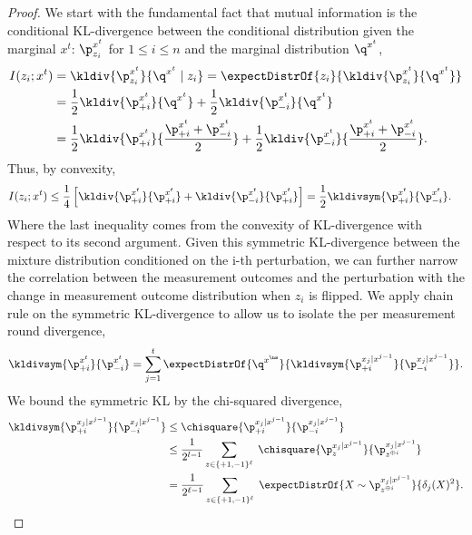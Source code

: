 \begin{proof}
    We start with the fundamental fact that mutual information is the conditional KL-divergence between the conditional distribution given the marginal $x^t$: $\p^{\out^t}_{z_i}$ for $1 \leq i \leq n$ and the marginal distribution $\q^{\out^t}$,
\begin{align*}
    I(z_i;x^t) &= \kldiv{\p^{\out^t}_{z_i}}{\q^{\out^t} \mid z_i} = \expectDistrOf{z_i}{\kldiv{\p^{\out^t}_{z_i}}{\q^{\out^t}}} \\ &= \frac{1}{2} \kldiv{\p_{+i}^{\out^t}}{\q^{\out^t}} + \frac{1}{2} \kldiv{\p_{-i}^{\out^t}}{\q^{\out^t}} \\ 
    &= \frac{1}{2} \kldiv{\p_{+i}^{\out^t}}{\frac{\p_{+i}^{\out^t} + \p_{-i}^{\out^t}}{2}} + \frac{1}{2} \kldiv{\p_{-i}^{\out^t}}{\frac{\p_{+i}^{\out^t} + \p_{-i}^{\out^t}}{2}}.
\end{align*}
Thus, by convexity, 
\begin{align}
    I(z_i;x^t) &\leq \frac{1}{4} \left[\kldiv{\p^{\out^t}_{+i}}{\p^{\out^t}_{+i}}+\kldiv{\p^{\out^t}_{-i}}{\p^{\out^t}_{+i}} \right] = \frac{1}{2} \kldivsym{\p^{\out^t}_{+i}}{\p^{\out^t}_{-i}} \label{pf:MI-bound}.
\end{align}
Where the last inequality comes from the convexity of KL-divergence with respect to its second argument. Given this symmetric KL-divergence between the mixture distribution conditioned on the i-th perturbation, we can further narrow the correlation between the measurement outcomes and the perturbation with the change in measurement outcome distribution when $z_i$ is flipped. We apply chain rule on the symmetric KL-divergence to allow us to isolate the per measurement round divergence,
\begin{align}
    \kldivsym{\p^{\out^t}_{+i}}{\p^{\out^t}_{-i}} = \sum_{j=1}^{t} \expectDistrOf{\q^{x^\ns}}{\kldivsym{\p^{\out_{j}|\out^{j-1}}_{+i}}{\p^{\out_{j}|\out^{j-1}}_{-i}}}.
    \label{eq:per-round-divergence}
\end{align}
We bound the symmetric KL by the chi-squared divergence,
\begin{align*}
    \kldivsym{\p^{\out_{j}|\out^{j-1}}_{+i}}{\p^{\out_{j}|\out^{j-1}}_{-i}} &\le \chisquare{\p^{\out_{j}|\out^{j-1}}_{+i}}{\p^{\out_{j}|\out^{j-1}}_{-i}} \\
    &\leq \frac{1}{2^{l-1}} \sum_{z \in \{+1,-1\}^\ell} \; \chisquare{\p^{\out_{j}|\out^{j-1}}_{z}}{\p^{\out_{j}|\out^{j-1}}_{z^{\oplus i}}}  \\
    &= \frac{1}{2^{\ell-1}} \sum_{z \in \{+1,-1\}^\ell} \; \expectDistrOf{X \sim \p^{\out_{j}|\out^{j-1}}_{z^{\oplus i}}}{\delta_j(X)^2}.

\end{align*}
\end{proof}
